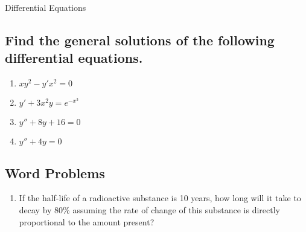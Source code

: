 \documentclass{article}
\begin{document}
\begin{center}
\begin{Huge}Differential Equations\end{Huge}
\end{center}


\subsection{Find the general solutions of the following differential equations.}

\begin{multicols}{2}
\begin{enumerate}
\item $xy^2-y'x^2=0$
\item $y'+3x^2y=e^{-x^3}$
\item $y''+8y+16=0$
\item $y''+4y=0$
\end{enumerate}
\end{multicols}


\subsection{Word Problems}
\begin{enumerate}
\item If the half-life of a radioactive substance is 10 years, how long will it take to decay by 80\% assuming the rate of change of this substance is directly proportional to the amount present?
\end{enumerate}
\end{document}
